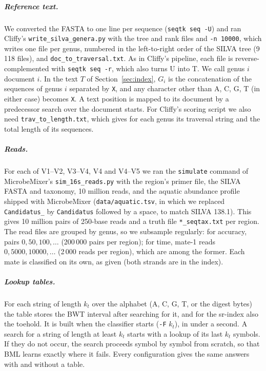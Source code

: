 \subparagraph*{Reference text.}
We converted the FASTA to one line per sequence (\texttt{seqtk seq -U}) and ran Cliffy's \texttt{write\_silva\_genera.py} with the tree and rank files and \texttt{-n 10000}, which writes one file per genus, numbered in the left-to-right order of the SILVA tree (9\,118 files), and \texttt{doc\_to\_traversal.txt}.
As in Cliffy's pipeline, each file is reverse-complemented with \texttt{seqtk seq -r}, which also turns U into T.
We call genus $i$ document $i$.
In the text $T$ of Section~\ref{sec:index}, $G_i$ is the concatenation of the sequences of genus $i$ separated by \texttt{X}, and any character other than A, C, G, T (in either case) becomes \texttt{X}.
A text position is mapped to its document by a predecessor search over the document starts.
For Cliffy's scoring script we also need \texttt{trav\_to\_length.txt}, which gives for each genus its traversal string and the total length of its sequences.

\subparagraph*{Reads.}
For each of V1--V2, V3--V4, V4 and V4--V5 we ran the \texttt{simulate} command of MicrobeMixer's \texttt{sim\_16s\_reads.py} with the region's primer file, the SILVA FASTA and taxonomy, 10 million reads, and the aquatic abundance profile shipped with MicrobeMixer (\texttt{data/aquatic.tsv}, in which we replaced \texttt{Candidatus\_} by \texttt{Candidatus} followed by a space, to match SILVA 138.1).
This gives 10 million pairs of 250-base reads and a truth file \texttt{*\_seqtax.txt} per region.
The read files are grouped by genus, so we subsample regularly: for accuracy, pairs $0, 50, 100, \ldots$ (200\,000 pairs per region); for time, mate-1 reads $0, 5000, 10000, \ldots$ (2\,000 reads per region), which are among the former.
Each mate is classified on its own, as given (both strands are in the index).

\subparagraph*{Lookup tables.}
For each string of length $k_t$ over the alphabet (A, C, G, T, or the digest bytes) the table stores the BWT interval after searching for it, and for the sr-index also the toehold.
It is built when the classifier starts (\texttt{-F} $k_t$), in under a second.
A search for a string of length at least $k_t$ starts with a lookup of its last $k_t$ symbols.
If they do not occur, the search proceeds symbol by symbol from scratch, so that BML learns exactly where it fails.
Every configuration gives the same answers with and without a table.

